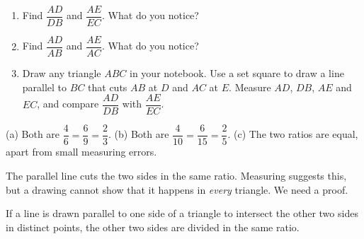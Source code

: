 \begin{activity}
\begin{enumerate}[leftmargin=1.8em,itemsep=2pt,label=(\alph*)]
  \item Find $\dfrac{AD}{DB}$ and $\dfrac{AE}{EC}$. What do you notice?
  \item Find $\dfrac{AD}{AB}$ and $\dfrac{AE}{AC}$. What do you notice?
  \item Draw any triangle $ABC$ in your notebook. Use a set square to draw a line parallel to $BC$ that cuts $AB$ at $D$ and $AC$ at $E$. Measure $AD$, $DB$, $AE$ and $EC$, and compare $\dfrac{AD}{DB}$ with $\dfrac{AE}{EC}$.
\end{enumerate}
\end{activity}

\begin{answerblock}
(a) Both are $\dfrac46=\dfrac69=\dfrac23$. \quad (b) Both are $\dfrac{4}{10}=\dfrac{6}{15}=\dfrac25$. \quad (c) The two ratios are equal, apart from small measuring errors.
\end{answerblock}

The parallel line cuts the two sides in the same ratio. Measuring suggests this, but a drawing cannot show that it happens in \emph{every} triangle. We need a proof.

\begin{theorem}
If a line is drawn parallel to one side of a triangle to intersect the other two sides in distinct points, the other two sides are divided in the same ratio.
\end{theorem}

\begin{center}\end{center}

